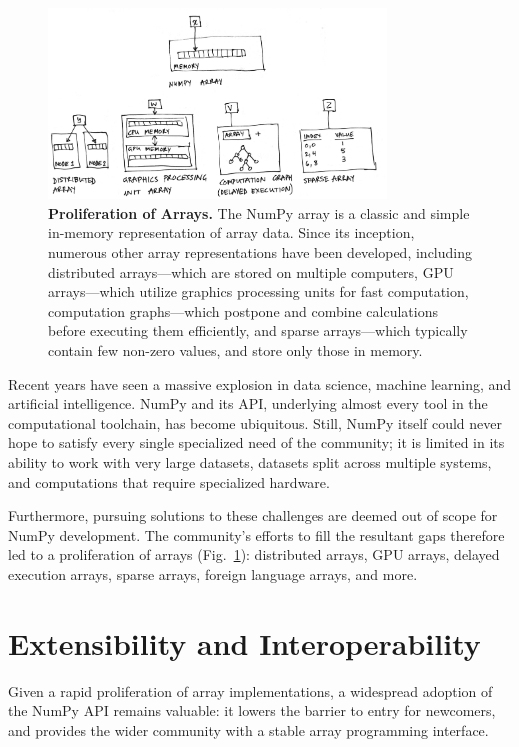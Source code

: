\begin{figure}
  \centering
  \includegraphics[width=0.8\textwidth]{static/sketches/duck-arrays}
  \caption{\textbf{Proliferation of Arrays.} The NumPy array is a classic and simple in-memory representation of array data. Since its inception, numerous other array representations have been developed, including distributed arrays---which are stored on multiple computers, GPU arrays---which utilize graphics processing units for fast computation, computation graphs---which postpone and combine calculations before executing them efficiently, and sparse arrays---which typically contain few non-zero values, and store only those in memory.}
  \label{fig:array-proliferation}
\end{figure}

Recent years have seen a massive explosion in data science, machine learning, and artificial intelligence.  NumPy and its API, underlying almost every tool in the computational toolchain, has become ubiquitous.  Still, NumPy itself could never hope to satisfy every single specialized need of the community; it is limited in its ability to work with very large datasets, datasets split across multiple systems, and computations that require specialized hardware.

Furthermore, pursuing solutions to these challenges are deemed out of scope for NumPy development. The community's efforts to fill the resultant gaps therefore led to a proliferation of arrays (Fig.~\ref{fig:array-proliferation}): distributed arrays, GPU arrays, delayed execution arrays, sparse arrays, foreign language arrays, and more.

\section*{Extensibility and Interoperability}

Given a rapid proliferation of array implementations, a widespread adoption of the NumPy API remains valuable: it lowers the barrier to entry for newcomers, and provides the wider community with a stable array programming interface.

